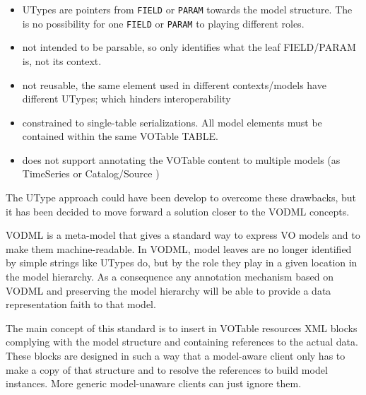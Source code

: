 \begin{itemize}
  \item UTypes are pointers from \texttt{FIELD} or \texttt{PARAM} towards the 
  model structure. The is no possibility for one  \texttt{FIELD} or
  \texttt{PARAM} to playing different roles.
  \item not intended to be parsable, so only identifies what the leaf 
  FIELD/PARAM is, not its context.
  \item not reusable, the same element used in different contexts/models 
  have different UTypes; which hinders interoperability
  \item constrained to single-table serializations. All model elements must 
  be contained within the same VOTable TABLE.
  \item does not support annotating the VOTable content to multiple models 
  (as TimeSeries or Catalog/Source )
\end{itemize}

The UType approach could have been develop to overcome these drawbacks, but it has been decided to move forward a solution closer to the VODML \citep{2018ivoa.spec.0910L} concepts. 

VODML is a meta-model that gives a standard way to express VO models and to make them machine-readable.
In VODML, model leaves are no longer identified by simple strings like UTypes do, but by the role they play in a given location in the model hierarchy.
As a consequence any annotation mechanism based on VODML and preserving the model hierarchy will be able  to provide a data representation faith to that model.

The main concept of this standard is to insert in VOTable resources XML blocks complying with the 
model structure and containing references to the actual data.
These blocks are designed in such a way that a model-aware client only has to make a copy of that structure and to resolve the references  
to build model instances. More generic model-unaware clients can just ignore them. 




